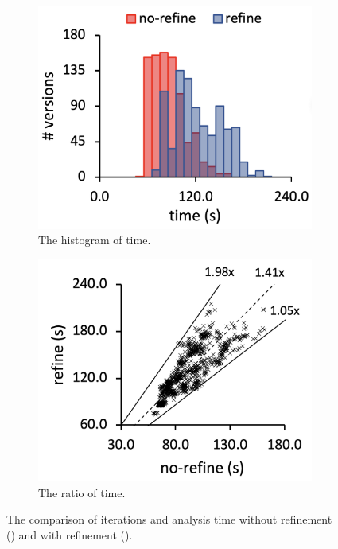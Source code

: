 \begin{figure}
\begin{subfigure}[b]{0.24\textwidth}
    \includegraphics[width=\textwidth]{img/compare-time}
    \caption{The histogram of time.}
  \end{subfigure}
  \begin{subfigure}[b]{0.24\textwidth}
    \includegraphics[width=\textwidth]{img/ratio-time}
    \caption{The ratio of time.}
  \end{subfigure}
  \caption{The comparison of iterations and analysis time without refinement
  () and with refinement ().}
  \label{fig:performance-compare}
  \vspace*{-1.5em}
\end{figure}

